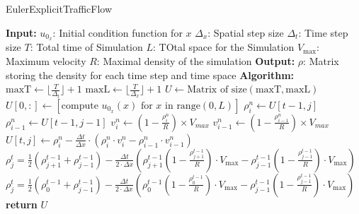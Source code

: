\documentclass{article}
\begin{document}
		\begin{algorithm}[H]
			\caption{EulerExplicitTrafficFlow}\label{alg:euler_traffic_flow}
			\begin{algorithmic}
				\State \textbf{Input:}
				\State $u_{0_x}$: Initial condition function for $x$
				\State $\Delta_x$: Spatial step size
				\State $\Delta_t$: Time step size
				\State $T$: Total time of Simulation
				\State $L$: TOtal space for the Simulation
				\State $V_{\text{max}}$: Maximum velocity
				\State $R$: Maximal density of the simulation
				\State \textbf{Output:}
				\State $\rho$: Matrix storing the density for each time step and time space 
				\State \textbf{Algorithm:}
				\State $\text{maxT} \gets \lfloor  \frac{T}{\Delta_t} \rfloor  + 1$ \newline
				\State $\text{maxL} \gets \lfloor  \frac{T}{\Delta_x} \rfloor  + 1$ \newline
				\State $U \gets \text{Matrix of size}(\text{maxT}, \text{maxL})$
				\State $U[0, :] \gets \left[ \text{compute } u_{0_x}(x) \text{ for } x \text{ in } \text{range}(0, L) \right]$
				\State $\rho_i^n \gets U[t-1, j]$
				\State $\rho_{i-1}^n \gets U[t-1, j-1]$
				\State $v_i^n \gets \left( 1 - \frac{\rho_i^n}{R}\right)  \times V_{max}$ \newline
				\State $v_{i-1}^n \gets \left( 1 - \frac{\rho_{i-1}^n}{R}\right)  \times V_{max}$
				\State $U[t, j] \gets \rho_i^n - \frac{\Delta t}{\Delta x} \cdot \left(\rho_i^n \cdot v_i^n - \rho_{i-1}^n \cdot v_{i-1}^n\right)$
				\State $\boxed{\rho_{j}^t = \frac{1}{2} \left(\rho_{j+1}^{t-1} + \rho_{j-1}^{t-1}\right) - \frac{\Delta t}{2 \cdot \Delta x} \left( \rho_{j+1}^{t-1} \left(1 - \frac{\rho_{j+1}^{t-1}}{R}\right) \cdot V_{\text{max}} - \rho_{j-1}^{t-1} \left(1 - \frac{\rho_{j-1}^{t-1}}{R}\right) \cdot V_{\text{max}} \right)}$
				\Else
				\State $\boxed{\rho_{j}^t = \frac{1}{2} \left(\rho_{0}^{t-1} + \rho_{j-1}^{t-1}\right) - \frac{\Delta t}{2 \cdot \Delta x} \left( \rho_{0}^{t-1} \left(1 - \frac{\rho_{0}^{t-1}}{R}\right) \cdot V_{\text{max}} - \rho_{j-1}^{t-1} \left(1 - \frac{\rho_{j-1}^{t-1}}{R}\right) \cdot V_{\text{max}} \right)}$
				\EndIf
				\EndIf
				\EndFor
				\EndFor
				\State \textbf{return} $U$
			\end{algorithmic}
		\end{algorithm}
\end{document}
